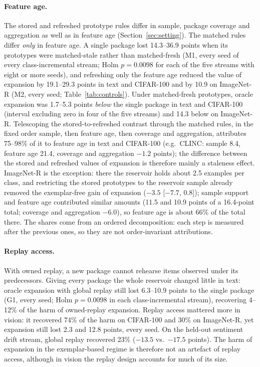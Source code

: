 \documentclass[10pt]{article}
\begin{document}
\paragraph{Feature age.} The stored and refreshed prototype rules differ in sample, package coverage and aggregation as well as in feature age (Section~\ref{sec:setting}). The matched rules differ \emph{only} in feature age. A single package lost 14.3--36.9 points when its prototypes were matched-stale rather than matched-fresh (M1, every seed of every class-incremental stream; Holm $p=0.0098$ for each of the five streams with eight or more seeds), and refreshing only the feature age reduced the value of expansion by 19.1--29.3 points in text and CIFAR-100 and by 10.9 on ImageNet-R (M2, every seed; Table~\ref{tab:controls}). Under matched-fresh prototypes, oracle expansion was 1.7--5.3 points \emph{below} the single package in text and CIFAR-100 (interval excluding zero in four of the five streams) and 14.3 below on ImageNet-R. Telescoping the stored-to-refreshed contrast through the matched rules, in the fixed order sample, then feature age, then coverage and aggregation, attributes 75--98\% of it to feature age in text and CIFAR-100 (e.g.\ CLINC: sample 8.4, feature age 21.4, coverage and aggregation $-1.2$ points); the difference between the stored and refreshed values of expansion is therefore mainly a staleness effect. ImageNet-R is the exception: there the reservoir holds about 2.5 examples per class, and restricting the stored prototypes to the reservoir sample already removed the exemplar-free gain of expansion ($-3.5$ [$-7.7$, 0.8]); sample support and feature age contributed similar amounts (11.5 and 10.9 points of a 16.4-point total; coverage and aggregation $-6.0$), so feature age is about 66\% of the total there. The shares come from an ordered decomposition: each step is measured after the previous ones, so they are not order-invariant attributions.

\paragraph{Replay access.} With owned replay, a new package cannot rehearse items observed under its predecessors. Giving every package the whole reservoir changed little in text: oracle expansion with global replay still lost 6.3--10.9 points to the single package (G1, every seed; Holm $p=0.0098$ in each class-incremental stream), recovering 4--12\% of the harm of owned-replay expansion. Replay access mattered more in vision: it recovered 74\% of the harm on CIFAR-100 and 30\% on ImageNet-R, yet expansion still lost 2.3 and 12.8 points, every seed. On the held-out sentiment drift stream, global replay recovered 23\% ($-13.5$ vs.\ $-17.5$ points). The harm of expansion in the exemplar-based regime is therefore not an artefact of replay access, although in vision the replay design accounts for much of its size.
\end{document}
